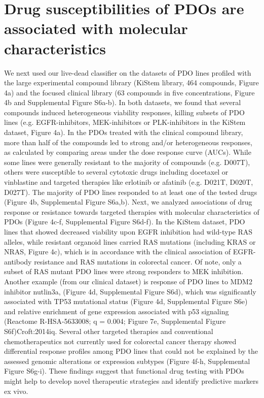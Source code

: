 \section{Drug susceptibilities of PDOs are associated with molecular characteristics}

We next used our live-dead classifier on the datasets of PDO lines profiled with the large experimental compound library (KiStem library, 464 compounds, Figure 4a) and the focused clinical library (63 compounds in five concentrations, Figure 4b and Supplemental Figure S6a-b). In both datasets, we found that several compounds induced heterogeneous viability responses, killing subsets of PDO lines (e.g. EGFR-inhibitors, MEK-inhibitors or PLK-inhibitors in the KiStem dataset, Figure 4a). In the PDOs treated with the clinical compound library, more than half of the compounds led to strong and/or heterogeneous responses, as calculated by comparing areas under the dose response curve (AUCs). While some lines were generally resistant to the majority of compounds (e.g. D007T), others were susceptible to several cytotoxic drugs including docetaxel or vinblastine and targeted therapies like erlotinib or afatinib (e.g. D021T, D020T, D027T). The majority of PDO lines responded to at least one of the tested drugs (Figure 4b, Supplemental Figure S6a,b). 
Next, we analyzed associations of drug response or resistance towards targeted therapies with molecular characteristics of PDOs (Figure 4c-f, Supplemental Figure S6d-f). In the KiStem dataset, PDO lines that showed decreased viability upon EGFR inhibition had wild-type RAS alleles, while resistant organoid lines carried RAS mutations (including KRAS or NRAS, Figure 4c), which is in accordance with the clinical association of EGFR-antibody resistance and RAS mutations in colorectal cancer. Of note, only a subset of RAS mutant PDO lines were strong responders to MEK inhibition. Another example (from our clinical dataset) is response of PDO lines to MDM2 inhibitor nutlin3a, (Figure 4d, Supplemental Figure S6d), which was significantly associated with TP53 mutational status (Figure 4d, Supplemental Figure S6e) and relative enrichment of gene expression associated with p53 signaling (Reactome R-HSA-5633008; q = 0.004; Figure 7e, Supplemental Figure S6f){Croft:2014iq}.
Several other targeted therapies and conventional chemotherapeutics not currently used for colorectal cancer therapy showed differential response profiles among PDO lines that could not be explained by the assessed genomic alterations or expression subtypes (Figure 4f-h, Supplemental Figure S6g-i). These findings suggest that functional drug testing with PDOs might help to develop novel therapeutic strategies and identify predictive markers ex vivo.

